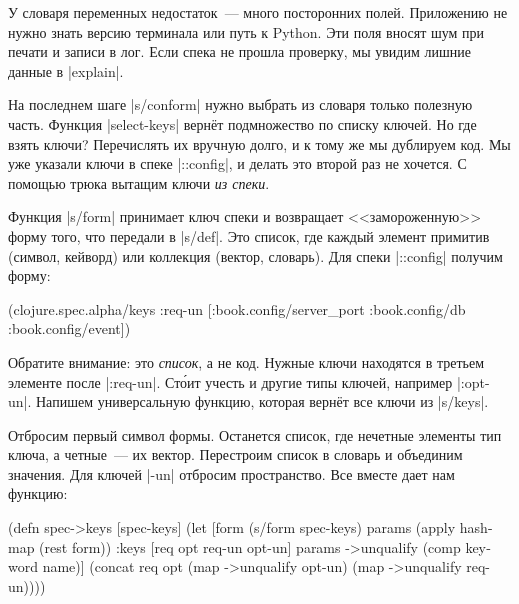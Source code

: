 У словаря переменных недостаток~--- много посторонних полей. Приложению не нужно
знать версию терминала или путь к Python. Эти поля вносят шум при печати и
записи в лог. Если спека не прошла проверку, мы увидим лишние данные в
\spverb|explain|.


На последнем шаге \spverb|s/conform| нужно выбрать из словаря только полезную
часть. Функция \spverb|select-keys| верн\"{е}т подмножество по списку ключей. Но где
взять ключи? Перечислять их вручную долго, и к тому же мы дублируем код. Мы уже
указали ключи в спеке \spverb|::config|, и делать это второй раз не хочется. С
помощью трюка вытащим ключи \emph{из спеки}.

Функция \spverb|s/form| принимает ключ спеки и возвращает <<замороженную>> форму
того, что передали в \spverb|s/def|. Это список, где каждый элемент примитив
(символ, кейворд) или коллекция (вектор, словарь). Для спеки \spverb|::config|
получим форму:

\begin{english}
  \begin{clojure}
(clojure.spec.alpha/keys
 :req-un [:book.config/server_port
          :book.config/db
          :book.config/event])
  \end{clojure}
\end{english}


Обратите внимание: это \emph{список}, а не код. Нужные ключи находятся в третьем
элементе после \spverb|:req-un|. Ст\'{о}ит учесть и другие типы ключей, например
\spverb|:opt-un|. Напишем универсальную функцию, которая верн\"{е}т все ключи из
\spverb|s/keys|.

Отбросим первый символ формы. Останется список, где нечетные элементы тип ключа,
а четные~--- их вектор. Перестроим список в словарь и объединим значения. Для
ключей \spverb|-un| отбросим пространство. Все вместе дает нам функцию:


\begin{english}
  \begin{clojure}
(defn spec->keys
  [spec-keys]
  (let [form (s/form spec-keys)
        params (apply hash-map (rest form))
        {:keys [req opt req-un opt-un]} params
        ->unqualify (comp keyword name)]
    (concat req
            opt
            (map ->unqualify opt-un)
            (map ->unqualify req-un))))
  \end{clojure}
\end{english}

